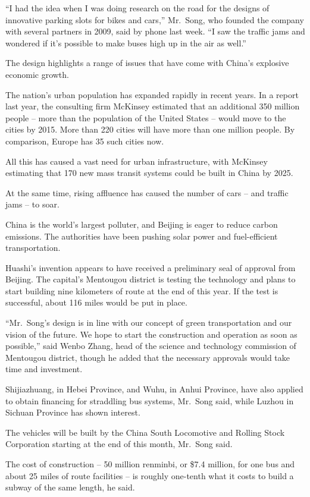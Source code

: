 ﻿\documentclass[12pt]{article}
\begin{document}
``I had the idea when I was doing research on the road for the designs of innovative parking slots
for bikes and cars,'' Mr.~Song, who founded the company with several partners in 2009, said by phone
last week. ``I saw the traffic jams and wondered if it's possible to make buses high up in the air
as well.''

The design highlights a range of issues that have come with China's explosive economic growth.

The nation's urban population has expanded rapidly in recent years. In a report last year, the
consulting firm McKinsey estimated that an additional 350 million people -- more than the population
of the United States -- would move to the cities by 2015. More than 220 cities will have more than
one million people. By comparison, Europe has 35 such cities now.

All this has caused a vast need for urban infrastructure, with McKinsey estimating that 170 new mass
transit systems could be built in China by 2025.

At the same time, rising affluence has caused the number of cars -- and traffic jams -- to soar.

China is the world's largest polluter, and Beijing is eager to reduce carbon emissions. The
authorities have been pushing solar power and fuel-efficient transportation.

Huashi's invention appears to have received a preliminary seal of approval from Beijing. The
capital's Mentougou district is testing the technology and plans to start building nine kilometers
of route at the end of this year. If the test is successful, about 116 miles would be put in place.

``Mr.~Song's design is in line with our concept of green transportation and our vision of the
future. We hope to start the construction and operation as soon as possible,'' said Wenbo Zhang,
head of the science and technology commission of Mentougou district, though he added that the
necessary approvals would take time and investment.

Shijiazhuang, in Hebei Province, and Wuhu, in Anhui Province, have also applied to obtain financing
for straddling bus systems, Mr.~Song said, while Luzhou in Sichuan Province has shown interest.

The vehicles will be built by the China South Locomotive and Rolling Stock Corporation starting at
the end of this month, Mr.~Song said.

The cost of construction -- 50 million renminbi, or \$7.4 million, for one bus and about 25 miles of
route facilities -- is roughly one-tenth what it costs to build a subway of the same length, he
said.
\end{document}
